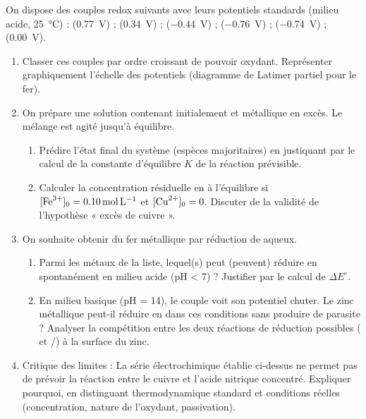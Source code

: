 \documentclass[11pt]{article}
\begin{document}
\begin{exercice}
On dispose des couples redox suivants avec leurs potentiels standards (milieu acide, \SI{25}{\celsius}) :
 (\SI{+0,77}{V}) ;  (\SI{+0,34}{V}) ;  (\SI{-0,44}{V}) ;  (\SI{-0,76}{V}) ;  (\SI{-0,74}{V}) ;  (\SI{0,00}{V}).
\begin{enumerate}
    \item Classer ces couples par ordre croissant de pouvoir oxydant. Représenter graphiquement l'échelle des potentiels (diagramme de Latimer partiel pour le fer).
    \item On prépare une solution contenant initialement  et  métallique en excès. Le mélange est agité jusqu'à équilibre.
    \begin{enumerate}
        \item Prédire l'état final du système (espèces majoritaires) en justiquant par le calcul de la constante d'équilibre $K$ de la réaction prévisible.
        \item Calculer la concentration résiduelle en  à l'équilibre si $[\ce{Fe^{3+}}]_0 = \SI{0,10}{mol.L^{-1}}$ et $[\ce{Cu^{2+}}]_0 = 0$. Discuter de la validité de l'hypothèse « excès de cuivre ».
    \end{enumerate}
    \item On souhaite obtenir du fer métallique par réduction de  aqueux.
    \begin{enumerate}
        \item Parmi les métaux de la liste, lequel(s) peut (peuvent) réduire  en  spontanément en milieu acide (pH < 7) ? Justifier par le calcul de $\Delta E^{\circ}$.
        \item En milieu basique (pH = 14), le couple  voit son potentiel chuter. Le zinc métallique peut-il réduire  en  dans ces conditions sans produire de  parasite ? Analyser la compétition entre les deux réactions de réduction possibles ( et /) à la surface du zinc.
    \end{enumerate}
    \item Critique des limites : La série électrochimique établie ci-dessus ne permet pas de prévoir la réaction entre le cuivre et l'acide nitrique concentré. Expliquer pourquoi, en distinguant thermodynamique standard et conditions réelles (concentration, nature de l'oxydant, passivation).
\end{enumerate}
\end{exercice}
\end{document}
